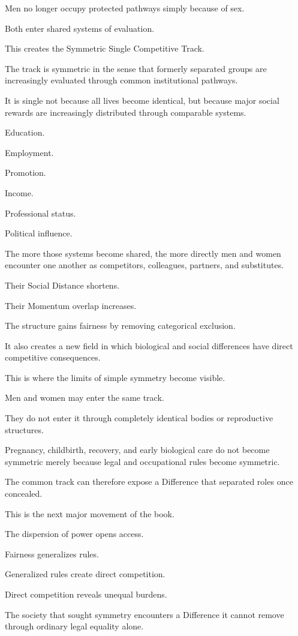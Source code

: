 Men no longer occupy protected pathways simply because of sex.

Both enter shared systems of evaluation.

This creates the Symmetric Single Competitive Track.

The track is symmetric in the sense that formerly separated groups are increasingly evaluated through common institutional pathways.

It is single not because all lives become identical, but because major social rewards are increasingly distributed through comparable systems.

Education.

Employment.

Promotion.

Income.

Professional status.

Political influence.

The more those systems become shared, the more directly men and women encounter one another as competitors, colleagues, partners, and substitutes.

Their Social Distance shortens.

Their Momentum overlap increases.

The structure gains fairness by removing categorical exclusion.

It also creates a new field in which biological and social differences have direct competitive consequences.

This is where the limits of simple symmetry become visible.

Men and women may enter the same track.

They do not enter it through completely identical bodies or reproductive structures.

Pregnancy, childbirth, recovery, and early biological care do not become symmetric merely because legal and occupational rules become symmetric.

The common track can therefore expose a Difference that separated roles once concealed.

This is the next major movement of the book.

The dispersion of power opens access.

Fairness generalizes rules.

Generalized rules create direct competition.

Direct competition reveals unequal burdens.

The society that sought symmetry encounters a Difference it cannot remove through ordinary legal equality alone.

